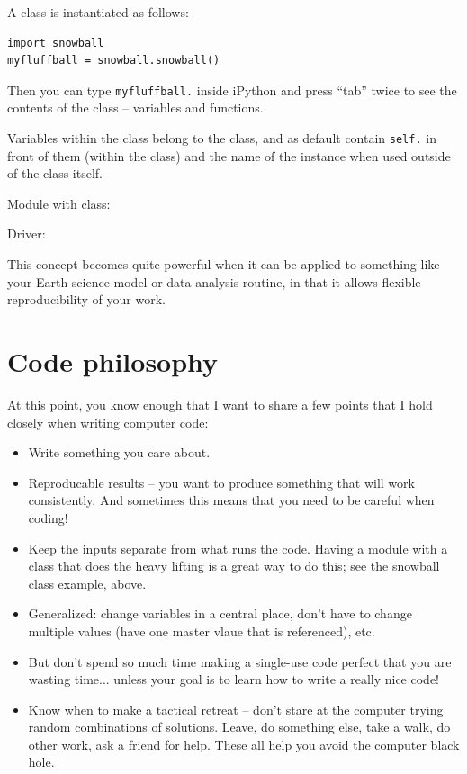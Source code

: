 \documentclass[a4paper,10pt]{scrartcl}
\begin{document}
A class is instantiated as follows:
\begin{lstlisting}
import snowball
myfluffball = snowball.snowball()
\end{lstlisting}
Then you can type \lstinline{myfluffball.} inside iPython and press ``tab'' twice to see the contents of the class -- variables and functions.

Variables within the class belong to the class, and as default contain \lstinline{self.} in front of them (within the class) and the name of the instance when used outside of the class itself.

Module with class:


Driver:


This concept becomes quite powerful when it can be applied to something like your Earth-science model or data analysis routine, in that it allows flexible reproducibility of your work.

\section{Code philosophy}

At this point, you know enough that I want to share a few points that I hold closely when writing computer code:

\begin{itemize}
 \item Write something you care about.
 \item Reproducable results -- you want to produce something that will work consistently. And sometimes this means that you need to be careful when coding!
 \item Keep the inputs separate from what runs the code. Having a module with a class that does the heavy lifting is a great way to do this; see the snowball class example, above.
 \item Generalized: change variables in a central place, don't have to change multiple values (have one master vlaue that is referenced), etc.
 \item But don't spend so much time making a single-use code perfect that you are wasting time... unless your goal is to learn how to write a really nice code!
 \item Know when to make a tactical retreat -- don't stare at the computer trying random combinations of solutions. Leave, do something else, take a walk, do other work, ask a friend for help. These all help you avoid the computer black hole.
\end{itemize}
\end{document}
